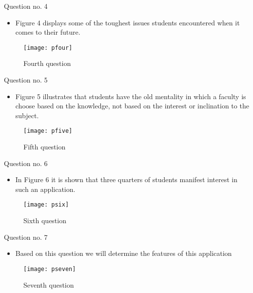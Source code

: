 \documentclass{beamer}
\begin{document}
\begin{frame}{Question no. 4}
	
	\begin{itemize}
		\item Figure 4 displays some of the toughest issues students encountered when it comes to their future.
	\end{itemize}
	
	\begin{figure}[t]
		\texttt{[image: pfour]}
		\centering
		\caption{Fourth question}
	\end{figure}
\end{frame}


\begin{frame}{Question no. 5}
	
	\begin{itemize}
		\item Figure 5 illustrates that students have the old mentality in which a faculty is choose based on the knowledge, not based on the interest or inclination to the subject.
	\end{itemize}
	
	\begin{figure}[t]
		\texttt{[image: pfive]}
		\centering
		\caption{Fifth question}
	\end{figure}
\end{frame}


\begin{frame}{Question no. 6}
	
	\begin{itemize}
		\item In Figure 6 it is shown that three quarters of students manifest interest in such an application.
	\end{itemize}
	
	\begin{figure}[t]
		\texttt{[image: psix]}
		\centering
		\caption{Sixth question}
	\end{figure}
\end{frame}


\begin{frame}{Question no. 7}
	
	\begin{itemize}
		\item Based on this question we will determine the features of this application
	\end{itemize}
	
	\begin{figure}[t]
		\texttt{[image: pseven]}
		\centering
		\caption{Seventh question}
	\end{figure}
\end{frame}
\end{document}
